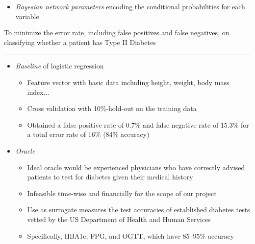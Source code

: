 \documentclass[a0]{a0poster}
\def\Head#1{\noindent{\LARGE\color{bluegray} #1}\bigskip}
\begin{document}
\begin{textblock}{7.0}
\begin{itemize}
  \item \emph{Bayesian network parameters} encoding the conditional probabilities for each variable

\end{itemize}

To minimize the error rate, including false positives and false negatives, on classifying whether a patient has Type II Diabetes

\medskip
\hrule\medskip
\Head{Evaluation Criteria}

\begin{itemize}
  
  \item \emph{Baseline} of logistic regression
  \begin{itemize}
    \item Feature vector with basic data including height, weight, body mass index...
    \item Cross validation with 10\%-hold-out on the training data
    \item Obtained a false positive rate of 0.7\% and false negative rate of 15.3\% for a total error rate of 16\% (84\% accuracy)
  \end{itemize}

  \item \emph{Oracle}
  \begin{itemize}
    \item Ideal oracle would be experienced physicians who have correctly advised patients to test for diabetes given their medical history
    \item Infeasible time-wise and financially for the scope of our project
    \item Use as surrogate measures the test accuracies of established diabetes tests vetted by the US Department of Health and Human Services
    \item Specifically, HBA1c, FPG, and OGTT, which have 85--95\% accuracy
  \end{itemize}

\end{itemize}

\end{textblock}
\end{document}
